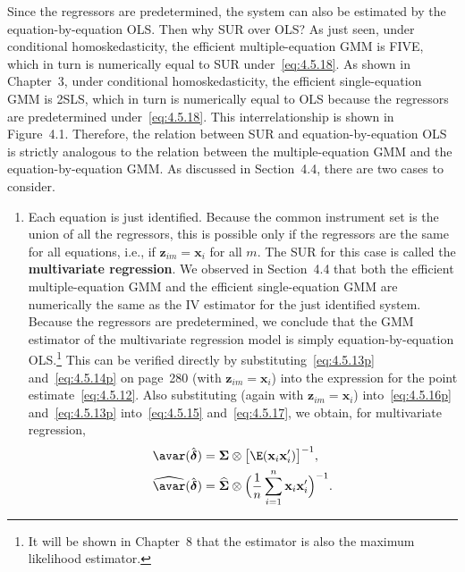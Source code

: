 Since the regressors are predetermined, the system can also be estimated by the
equation-by-equation OLS. Then why SUR over OLS? As just seen, under conditional
homoskedasticity, the efficient multiple-equation GMM is FIVE, which in
turn is numerically equal to SUR under~\eqref{eq:4.5.18}. As shown in Chapter~3,
under conditional homoskedasticity, the efficient single-equation GMM is 2SLS,
which in turn is numerically equal to OLS because the regressors are predetermined
under~\eqref{eq:4.5.18}. This interrelationship is shown in Figure~4.1.
Therefore, the relation between SUR and equation-by-equation OLS is strictly
analogous to the relation between the multiple-equation GMM and the
equation-by-equation GMM. As discussed in Section~4.4, there are two cases to consider.

\begin{enumerate}[label=(\alph*)]
\item Each equation is just identified. Because the common instrument set is the
union of all the regressors, this is possible only if the regressors are the same
for all equations, i.e., if $\mathbf{z}_{im} = \mathbf{x}_i$ for all $m$.
The SUR for this case is called the \textbf{multivariate regression}.
We observed in Section~4.4 that both the efficient multiple-equation GMM and
the efficient single-equation GMM are numerically the same as the IV estimator
for the just identified system. Because the regressors are predetermined, we
conclude that the GMM estimator of the multivariate regression model is simply
equation-by-equation OLS.\footnote{It will be shown in Chapter~8 that the
estimator is also the maximum likelihood estimator.}
This can be verified directly by substituting~\eqref{eq:4.5.13p}
and~\eqref{eq:4.5.14p} on page~280 (with $\mathbf{z}_{im} = \mathbf{x}_i$)
into the expression for the point estimate~\eqref{eq:4.5.12}.
Also substituting (again with $\mathbf{z}_{im} = \mathbf{x}_i$)
into~\eqref{eq:4.5.16p} and~\eqref{eq:4.5.13p}
into~\eqref{eq:4.5.15} and~\eqref{eq:4.5.17}, we obtain, for multivariate regression,
\begin{align}
\avar(\hat{\boldsymbol{\delta}})
&= \boldsymbol{\Sigma} \otimes \bigl[\E(\mathbf{x}_i \mathbf{x}_i')\bigr]^{-1},
\label{eq:4.5.22} \\
\widehat{\avar}(\hat{\boldsymbol{\delta}})
&= \widehat{\boldsymbol{\Sigma}} \otimes
\Bigl(\frac{1}{n} \sum_{i=1}^{n} \mathbf{x}_i \mathbf{x}_i'\Bigr)^{-1}.
\label{eq:4.5.23}
\end{align}


\end{enumerate}
